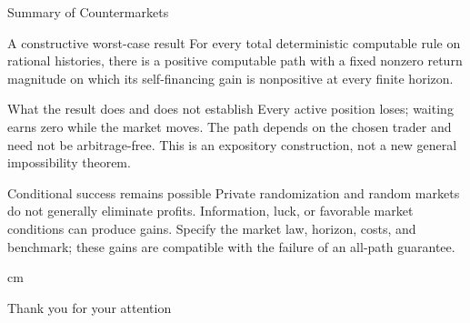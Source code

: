\documentclass{beamer}
\begin{document}
\begin{frame}{Summary of Countermarkets}
\small
\begin{block}{A constructive worst-case result}
For every total deterministic computable rule on rational histories,
there is a positive computable path with a fixed nonzero return magnitude
on which its self-financing gain is nonpositive at every finite horizon.
\end{block}
\begin{alertblock}{What the result does and does not establish}
Every active position loses; waiting earns zero while the market moves.
The path depends on the chosen trader and need not be arbitrage-free.
This is an expository construction, not a new general impossibility theorem.
\end{alertblock}
\begin{exampleblock}{Conditional success remains possible}
Private randomization and random markets do not generally eliminate profits.
Information, luck, or favorable market conditions can produce gains.
Specify the market law, horizon, costs, and benchmark; these gains are
compatible with the failure of an all-path guarantee.
\end{exampleblock}
\end{frame}


\begin{frame}
 cm
\begin{center}
\Large\color{blue}Thank you for your attention
\end{center}
\end{frame}
\end{document}
